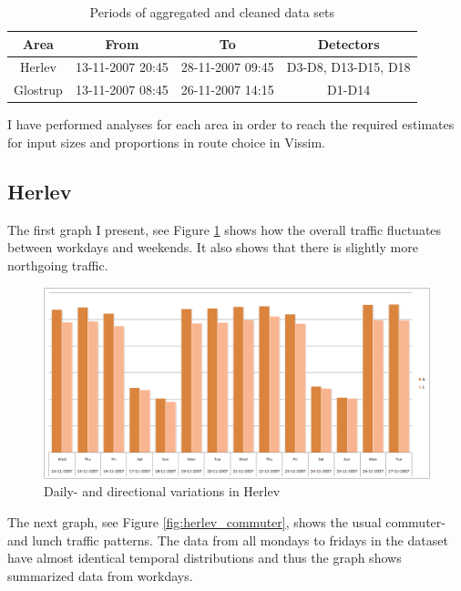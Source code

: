 \begin{table}[!ht]
\begin{center}
\begin{tabular}{c|c|c|c}
\textbf{Area} & \textbf{From} & \textbf{To} & \textbf{Detectors} \\ \hline
Herlev & 13-11-2007 20:45 & 28-11-2007 09:45 & D3-D8, D13-D15, D18 \\
Glostrup & 13-11-2007 08:45 & 26-11-2007 14:15 & D1-D14 \\
\end{tabular}
\end{center}
\caption{Periods of aggregated and cleaned data sets}
\label{tab:dataperiod}
\end{table}

I have performed analyses for each area in order to reach the required estimates for input sizes and proportions in route choice in Vissim.

\subsection{Herlev}

The first graph I present, see Figure \ref{fig:herlev_props} shows how the overall traffic fluctuates between workdays and weekends. It also shows that there is slightly more northgoing traffic.

\begin{figure}[!ht]
\begin{center}
\includegraphics[scale=0.35]{herlev_direction_proportions.png} 
\end{center}
\caption{Daily- and directional variations in Herlev}
\label{fig:herlev_props}
\end{figure}

The next graph, see Figure \ref{fig:herlev_commuter}, shows the usual commuter- and lunch traffic patterns. The data from all mondays to fridays in the dataset have almost identical temporal distributions and thus the graph shows summarized data from workdays.

